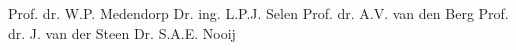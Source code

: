 \thispagestyle{empty}



\clearpage
\thispagestyle{empty}
	
\noindent {}
\noindent \npar Prof. dr. W.P. Medendorp
\npar
\noindent {}
\noindent \npar Dr. ing. L.P.J. Selen
\npar
\vspace{0.5cm}
\noindent {}
\noindent \npar Prof. dr. A.V. van den Berg
\noindent \npar Prof. dr. J. van der Steen
\noindent \npar Dr. S.A.E. Nooij
